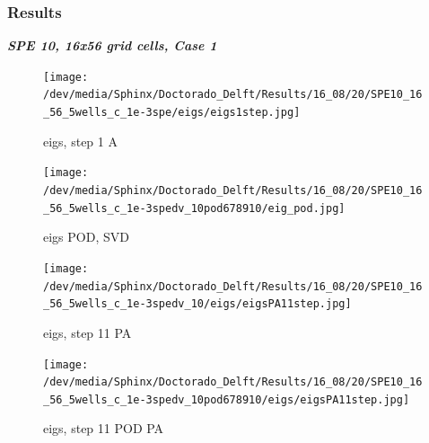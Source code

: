 \documentclass{beamer}
\begin{document}
\begin{frame}[shrink=10]
\frametitle{Results}

\emph{\textbf{SPE 10, 16x56 grid cells, Case 1}}\\
\begin{figure}
\centering
\begin{minipage}{.45\textwidth}
 \centering
\texttt{[image: /dev/media/Sphinx/Doctorado\_Delft/Results/16\_08/20/SPE10\_16\_56\_5wells\_c\_1e-3spe/eigs/eigs1step.jpg]}
\caption{eigs, step 1 A}
\label{fig:compsol}
\end{minipage}%
\hspace{10mm}
\begin{minipage}{.45\textwidth}
 \centering
\texttt{[image: /dev/media/Sphinx/Doctorado\_Delft/Results/16\_08/20/SPE10\_16\_56\_5wells\_c\_1e-3spedv\_10pod678910/eig\_pod.jpg]}
\caption{eigs POD, SVD}
\label{fig:NR_IC}
\end{minipage}
\end{figure}
\begin{figure}[!h]
\centering
\begin{minipage}{.4\textwidth}
 \centering
\texttt{[image: /dev/media/Sphinx/Doctorado\_Delft/Results/16\_08/20/SPE10\_16\_56\_5wells\_c\_1e-3spedv\_10/eigs/eigsPA11step.jpg]}
\caption{eigs, step 11 PA}
\label{fig:NR_D10}
\end{minipage}%
\hspace{15mm}
\begin{minipage}{.4\textwidth}
 \centering
\texttt{[image: /dev/media/Sphinx/Doctorado\_Delft/Results/16\_08/20/SPE10\_16\_56\_5wells\_c\_1e-3spedv\_10pod678910/eigs/eigsPA11step.jpg]}
\caption{eigs, step 11 POD PA}
\label{fig:NR_POD5}
\end{minipage}
\end{figure}
\end{frame}
\end{document}
